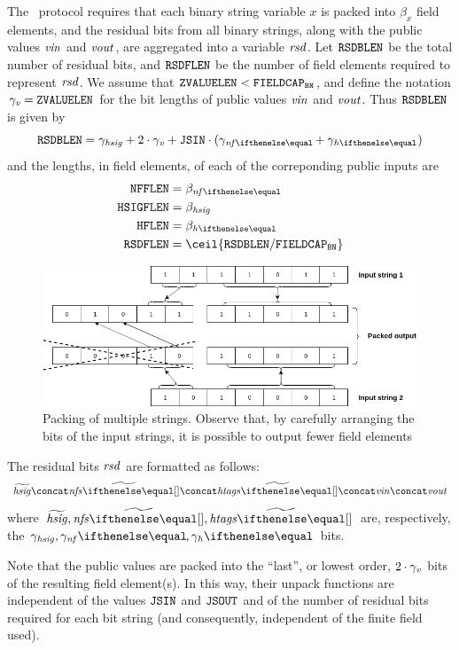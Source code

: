 The \zeth~protocol requires that each binary string variable $x$ is packed into $\beta_x$ field elements, and the residual bits from all binary strings, along with the public values $\mathit{vin}$ and $\mathit{vout}$, are aggregated into a variable $\mathit{rsd}$. Let $\mathtt{RSDBLEN}$ be the total number of residual bits, and $\mathtt{RSDFLEN}$ be the number of field elements required to represent $\mathit{rsd}$. We assume that $\mathtt{ZVALUELEN} < \mathtt{FIELDCAP_{BN}}$, and define the notation $\gamma_{\mathit{v}} = \mathtt{ZVALUELEN}$ for the bit lengths of public values $\mathit{vin}$ and $\mathit{vout}$. Thus $\mathtt{RSDBLEN}$ is given by
\[
    \resBitsBLen = \gamma_\hsig + 2 \cdot \gamma_\notev + \jsin \cdot (\gamma_{\nf{}} + \gamma_{\htag{}} )
\]
and the lengths, in field elements, of each of the correponding public inputs are
\begin{align*}
    \nfFLen &= \beta_{\nf{}} \\
    \hsigFLen &= \beta_{\hsig} \\
    \htagFLen &= \beta_{\htag{}} \\
    \resBitsFLen &= \ceil{\resBitsBLen / \bnFieldBitCap}
\end{align*}

\begin{figure}[ht]
    \centering
    \includegraphics[width=1\textwidth]{images/bit-packing-multi-strings.png}
    \caption{Packing of multiple strings. Observe that, by carefully arranging the bits of the input strings, it is possible to output fewer field elements}\label{instantiation:fig:packing-multi-strings}
\end{figure}

The residual bits $\mathit{rsd}$ are formatted as follows:
\[
    \widetilde{\hsig} \concat \widetilde{\nfs{}} \concat \widetilde{\htags{}} \concat \vin \concat \vout
\]
where $\widetilde{\hsig}, \widetilde{\nfs{}}, \widetilde{\htags{}}$ are, respectively, the $\gamma_\hsig, \gamma_\nf{}, \gamma_\htag{}$ bits.

Note that the public values are packed into the ``last'', or lowest order, $2 \cdot \gamma_{\mathit{v}}$ bits of the resulting field element(s). In this way, their unpack functions are independent of the values $\mathtt{JSIN}$ and $\mathtt{JSOUT}$ and of the number of residual bits required for each bit string (and consequently, independent of the finite field used).

